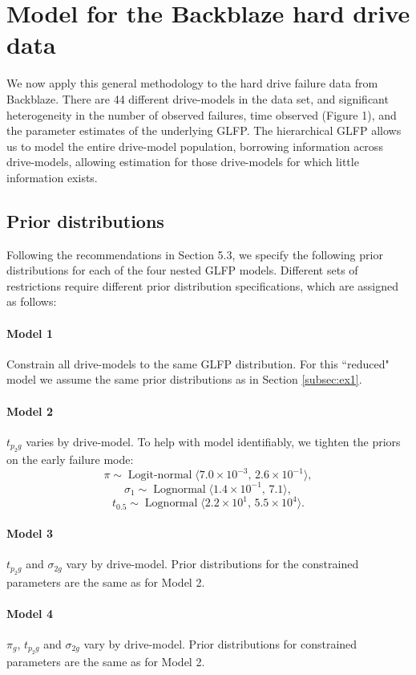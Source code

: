 \documentclass[12pt]{article}
\newcommand{\op}{\operatorname}
\begin{document}
\section{Model for the Backblaze hard drive data}
\label{sec:Data analysis}
We now apply this general methodology to the hard drive failure data from Backblaze.  There are 44 different drive-models in the data set, and significant heterogeneity in the number of observed failures, time observed (Figure 1), and the parameter estimates of the underlying GLFP. The hierarchical GLFP allows us to model the entire drive-model population, borrowing information across drive-models, allowing estimation for those drive-models for which little information exists. 

\subsection{Prior distributions}
\label{sec:Prior distributions}
Following the recommendations in Section 5.3, we specify the following prior distributions for each of the four nested GLFP models. Different sets of restrictions require different prior distribution specifications, which are assigned as follows:

\paragraph{Model 1} Constrain all drive-models to the same GLFP distribution. For this ``reduced" model we assume the same prior distributions as in Section \ref{subsec:ex1}.

\paragraph{Model 2} $t_{p_{2}g}$ varies by drive-model. To help with model identifiably, we tighten the priors on the early failure mode:
$$ \pi \sim \op{Logit-normal}\langle 7.0\times 10^{-3},\, 2.6 \times 10^{-1} \rangle,$$
$$\sigma_1 \sim \op{Lognormal}\langle 1.4 \times 10^{-1},\, 7.1\rangle,$$ 
$$t_{0.5} \sim \op{Lognormal} \langle 2.2 \times 10^1,\, 5.5 \times 10^{4} \rangle.$$

\paragraph{Model 3} $t_{p_{2}g}$ and $\sigma_{2g}$ vary by drive-model. Prior distributions for the constrained parameters are the same as for Model 2.

\paragraph{Model 4} $\pi_g$, $t_{p_{2}g}$ and $\sigma_{2g}$ vary by drive-model. Prior distributions for constrained parameters are the same as for Model 2.
\end{document}
